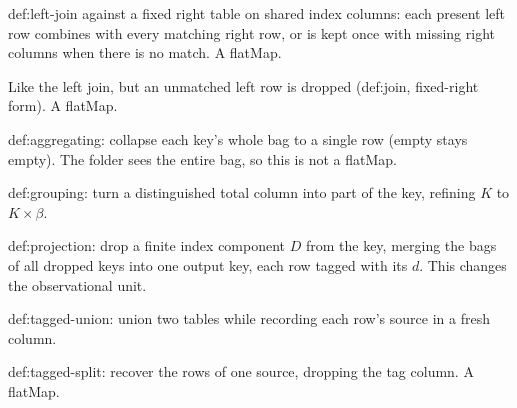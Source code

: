 \begin{definition}
  \label{def:leftjoin}\leanok
  def:left-join against a fixed right table on shared index columns:
  each present left row combines with every matching right row, or is
  kept once with missing right columns when there is no match.  A flatMap.
\end{definition}

\begin{definition}
  \label{def:innerjoin}\leanok
  Like the left join, but an unmatched left row is dropped (def:join,
  fixed-right form).  A flatMap.
\end{definition}

\begin{definition}[Aggregate]
  \label{def:aggregate}\leanok
  def:aggregating: collapse each key's whole bag to a single row (empty
  stays empty).  The folder sees the entire bag, so this is not a flatMap.
\end{definition}

\begin{definition}[Ungroup]
  \label{def:promote}\leanok
  def:grouping: turn a distinguished total column into part of the key,
  refining $K$ to $K \times \beta$.
\end{definition}

\begin{definition}[Project]
  \label{def:demote}\leanok
  def:projection: drop a finite index component $D$ from the key,
  merging the bags of all dropped keys into one output key, each row
  tagged with its $d$.  This changes the observational unit.
\end{definition}

\begin{definition}
  \label{def:tagged-union}\leanok
  def:tagged-union: union two tables while recording each row's source in
  a fresh column.
\end{definition}

\begin{definition}
  \label{def:tagged-split}\leanok
  def:tagged-split: recover the rows of one source, dropping the tag
  column.  A flatMap.
\end{definition}

